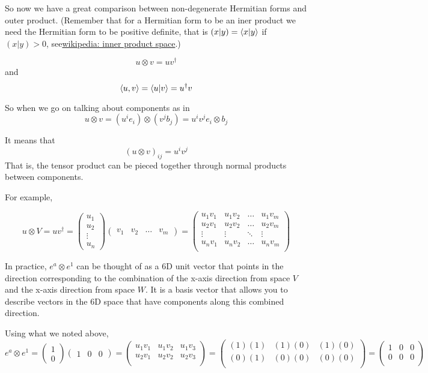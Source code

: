 So now we have a great comparison between non-degenerate Hermitian forms and outer product.
(Remember that for a Hermitian form to be an iner product we need the Hermitian form to be
positive definite, that is $(x | y) = \braket{x | y }$ if
 $(x | y)> 0$, see\href{https://en.wikipedia.org/wiki/Inner_product_space}{wikipedia: inner product space}.)

$$
u \otimes v = uv^\dagger
$$
and
$$
\braket{u, v} = \braket{u | v} = u^\dagger v
$$

So when we go on talking about components as in
$$
u \otimes v 
= (u^i e_i) \otimes (v^j b_j)
= u^i v^j e_i \otimes b_j
$$

It means that
$$
(u \otimes v)_{ij} = u^i v^j
$$
That is, the tensor product can be pieced together through normal products between components.

For example,

$$
u \otimes V
= u v^\dagger
=
\begin{pmatrix}
    u_1 \\
    u_2 \\
    \vdots \\
    u_n
\end{pmatrix}
\begin{pmatrix}
    v_1 & v_2 & \dots & v_m
\end{pmatrix}
=
\begin{pmatrix}
u_1 v_1 & u_1 v_2 & \dots  & u_1 v_m \\
u_2 v_1 & u_2 v_2 & \dots  & u_2 v_m \\
\vdots  & \vdots  & \ddots & \vdots \\
u_n v_1 & u_n v_2 & \dots & u_n v_m \\
\end{pmatrix}
$$

In practice, $e^a \otimes e^1$ can be thought of as a 6D unit vector that points in the direction
corresponding to the combination of the x-axis direction from space $V$ and the x-axis direction from space $W$.
It is a basis vector that allows you to describe vectors in the 6D space that have components along this combined direction.

Using what we noted above,
$$
e^a \otimes e^1
= 
\begin{pmatrix}
    1 \\
    0
\end{pmatrix}
\begin{pmatrix}
    1 & 0 & 0
\end{pmatrix}
=
\begin{pmatrix}
u_1 v_1 & u_1 v_2 & u_1 v_3 \\
u_2 v_1 & u_2 v_2 & u_2 v_3 \\
\end{pmatrix}
=
\begin{pmatrix}
(1) (1) & (1) (0) & (1) (0) \\
(0) (1) & (0) (0) & (0) (0) \\
\end{pmatrix}
=
\begin{pmatrix}
1 & 0 & 0 \\
0 & 0 & 0 \\
\end{pmatrix}
$$

